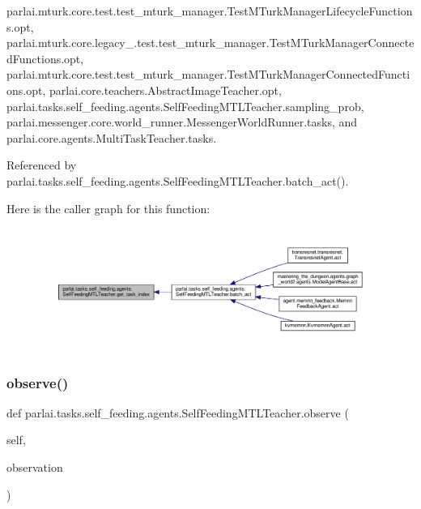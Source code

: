parlai.\+mturk.\+core.\+test.\+test\+\_\+mturk\+\_\+manager.\+Test\+M\+Turk\+Manager\+Lifecycle\+Functions.\+opt, parlai.\+mturk.\+core.\+legacy\+\_.\+test.\+test\+\_\+mturk\+\_\+manager.\+Test\+M\+Turk\+Manager\+Connected\+Functions.\+opt, parlai.\+mturk.\+core.\+test.\+test\+\_\+mturk\+\_\+manager.\+Test\+M\+Turk\+Manager\+Connected\+Functions.\+opt, parlai.\+core.\+teachers.\+Abstract\+Image\+Teacher.\+opt, parlai.\+tasks.\+self\+\_\+feeding.\+agents.\+Self\+Feeding\+M\+T\+L\+Teacher.\+sampling\+\_\+prob, parlai.\+messenger.\+core.\+world\+\_\+runner.\+Messenger\+World\+Runner.\+tasks, and parlai.\+core.\+agents.\+Multi\+Task\+Teacher.\+tasks.



Referenced by parlai.\+tasks.\+self\+\_\+feeding.\+agents.\+Self\+Feeding\+M\+T\+L\+Teacher.\+batch\+\_\+act().

Here is the caller graph for this function\+:
\nopagebreak
\begin{figure}[H]
\begin{center}
\leavevmode
\includegraphics[width=350pt]{classparlai_1_1tasks_1_1self__feeding_1_1agents_1_1SelfFeedingMTLTeacher_a19777439481c688e85f355802ff4a791_icgraph}
\end{center}
\end{figure}
\mbox{\label{classparlai_1_1tasks_1_1self__feeding_1_1agents_1_1SelfFeedingMTLTeacher_a6028394bf25ea9ae027bcf59a302a72c}} 
\subsubsection{\texorpdfstring{observe()}{observe()}}
{\footnotesize\ttfamily def parlai.\+tasks.\+self\+\_\+feeding.\+agents.\+Self\+Feeding\+M\+T\+L\+Teacher.\+observe (\begin{DoxyParamCaption}\item[{}]{self,  }\item[{}]{observation }\end{DoxyParamCaption})}



